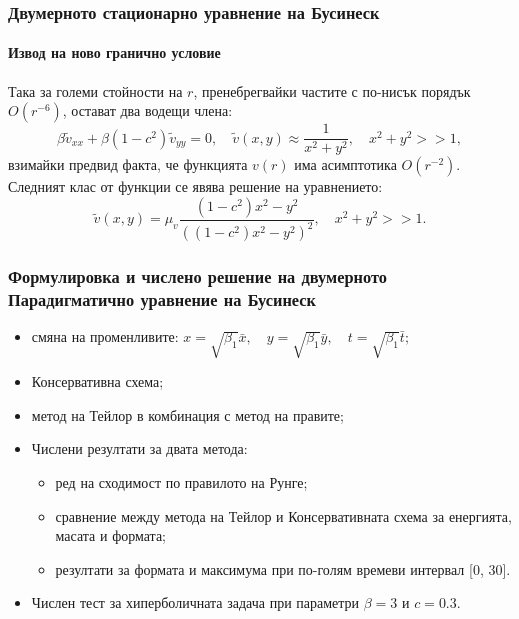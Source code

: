 \documentclass{beamer}
\begin{document}
\begin{frame}
\frametitle{Двумерното стационарно уравнение на Бусинеск}
\framesubtitle{Извод на ново гранично условие}
Така за големи стойности на $r$, пренебрегвайки частите с по-нисък порядък $O(r^{-6})$, остават два водещи члена:
\begin{equation}\label{asymptEq}
\beta \tilde v_{xx} + \beta (1-c^2) \tilde v_{yy} =0, \quad \tilde v(x,y) \approx \frac{1}{x^2 + y^2}, \quad x^2 + y^2 >>1,
\end{equation} 
взимайки предвид факта, че функцията $v(r)$ има асимптотика $O(r^{-2})$. Следният клас от функции се явява решение на уравнението:
\begin{equation}\label{bndK}
\tilde v(x,y) = \mu_v \frac{ (1-c^2)x^2 - y^2}{ ((1-c^2)x^2 - y^2)^2}, \quad x^2 + y^2 >> 1.
\end{equation}
\end{frame}



\begin{frame}
\frametitle{Формулировка и числено решение на двумерното Парадигматично уравнение на Бусинеск}
 
\begin{itemize}
  \item смяна на променливите:
$
x = \sqrt{\beta_1} \bar{x}, \quad y = \sqrt{\beta_1} \bar{y}, \quad t = \sqrt{\beta_1} \bar{t};
$
  \item Консервативна схема;
  \item метод на Тейлор в комбинация с метод на правите;
  \item Числени резултати за двата метода:
  \begin{itemize}
	  \item ред на сходимост по правилото на Рунге;  
	  \item сравнение между метода на Тейлор и Консервативната схема за енергията, масата и формата;
	  \item резултати за формата и максимума при по-голям времеви интервал [0, 30].
	\end{itemize}
  \item Числен тест за хиперболичната задача при параметри $\beta = 3$ и $c=0.3$.
\end{itemize}

\end{frame}
\end{document}
